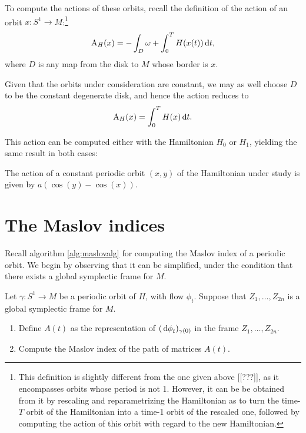 To compute the actions of these orbits, recall the definition of the action of an orbit $x \colon S^1 \to M$:\footnote{This definition is slightly different from the one given above [[???]], as it encompasses orbits whose period is not 1. However, it can be be obtained from it by rescaling and reparametrizing the Hamiltonian as to turn the time-$T$ orbit of the Hamiltonian into a time-1 orbit of the rescaled one, followed by computing the action of this orbit with regard to the new Hamiltonian.}
\begin{equation}
\AA_{H}(x) = - \int_D \omega + \int_0^T H(x(t)) \dl t,
\end{equation}
where $D$ is any map from the disk to $M$ whose border is $x$.

Given that the orbits under consideration are constant, we may as well choose $D$ to be the constant degenerate disk, and hence the action reduces to
\begin{equation}
\AA_H(x) = \int_0^T H(x) \dl t.
\end{equation}

This action can be computed either with the Hamiltonian $H_0$ or $H_1$, yielding the same result in both cases:
\begin{prop}
The action of a constant periodic orbit $(x,y)$ of the Hamiltonian under study is given by $a (\cos(y) - \cos(x))$.
\end{prop}

\section{The Maslov indices}

Recall algorithm \ref{alg:maslovalg} for computing the Maslov index of a periodic orbit. We begin by observing that it can be simplified, under the condition that there exists a global symplectic frame for $M$.

\begin{algorithm}
Let $\gamma \colon S^1 \to M$ be a periodic orbit of $H$, with flow $\phi_t$. Suppose that $Z_1, \dots, Z_{2n}$ is a global symplectic frame for $M$.
\begin{enumerate}[algorithm]
\item Define $A(t)$ as the representation of $(\dl \phi_t)_{\gamma(0)}$ in the frame $Z_1, \dots, Z_{2n}$.
\item Compute the Maslov index of the path of matrices $A(t)$.
\end{enumerate}
\end{algorithm}

